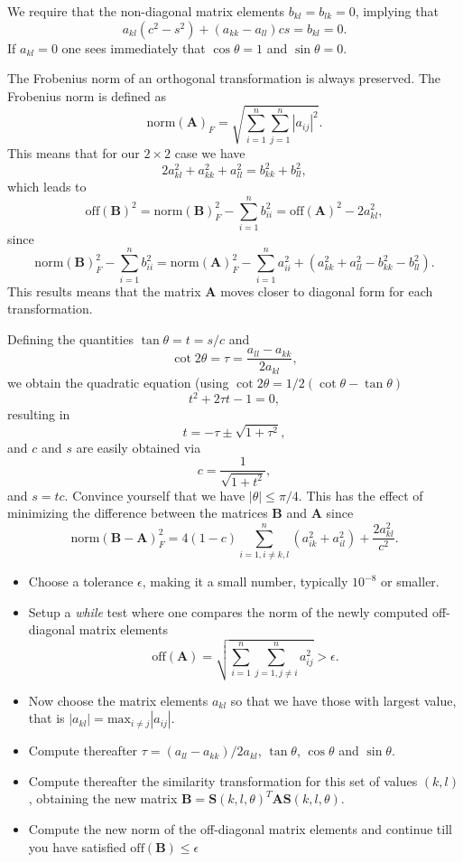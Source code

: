 \documentclass[%
oneside,                 %
final,                   %
10pt]{article}
\begin{document}
We require that the non-diagonal matrix elements $b_{kl}=b_{lk}=0$, implying that 
\[
a_{kl}(c^2-s^2)+(a_{kk}-a_{ll})cs = b_{kl} = 0.
\]
If $a_{kl}=0$ one sees immediately that $\cos\theta = 1$ and $\sin\theta=0$.

The Frobenius norm of an orthogonal transformation is always preserved. The Frobenius norm is defined
as 
\[
 \mathrm{norm}(\mathbf{A})_F =  \sqrt{\sum_{i=1}^n\sum_{j=1}^n |a_{ij}|^2}.
\]
This means that for our $2\times 2$ case  we have
\[
2a_{kl}^2+a_{kk}^2+a_{ll}^2 = b_{kk}^2+b_{ll}^2,
\]
which leads to
\[
\mathrm{off}(\mathbf{B})^2 = \mathrm{norm}(\mathbf{B})_F^2-\sum_{i=1}^nb_{ii}^2=\mathrm{off}(\mathbf{A})^2-2a_{kl}^2,
\]
since
\[
  \mathrm{norm}(\mathbf{B})_F^2-\sum_{i=1}^nb_{ii}^2=\mathrm{norm}(\mathbf{A})_F^2-\sum_{i=1}^na_{ii}^2+(a_{kk}^2+a_{ll}^2 -b_{kk}^2-b_{ll}^2).
\]
This results means that  the matrix $\mathbf{A}$ moves closer to diagonal form  for each transformation.

Defining the quantities $\tan\theta = t= s/c$ and
\[\cot 2\theta=\tau = \frac{a_{ll}-a_{kk}}{2a_{kl}},
\]
we obtain the quadratic equation (using $\cot 2\theta=1/2(\cot \theta-\tan\theta)$
\[
t^2+2\tau t-1= 0,
\]
resulting in 
\[
  t = -\tau \pm \sqrt{1+\tau^2},
\]
and $c$ and $s$ are easily obtained via
\[
   c = \frac{1}{\sqrt{1+t^2}},
\]
and $s=tc$.  Convince yourself that we have $|\theta| \le \pi/4$. This has the effect  
of minimizing the difference between the matrices $\mathbf{B}$ and $\mathbf{A}$ since
\[
\mathrm{norm}(\mathbf{B}-\mathbf{A})_F^2=4(1-c)\sum_{i=1,i\ne k,l}^n(a_{ik}^2+a_{il}^2) +\frac{2a_{kl}^2}{c^2}.
\]

\begin{itemize}
 \item Choose a tolerance $\epsilon$, making it a small number, typically $10^{-8}$ or smaller.

 \item Setup a \emph{while} test  where one compares the norm of the newly computed off-diagonal matrix elements  \[ \mathrm{off}(\mathbf{A}) = \sqrt{\sum_{i=1}^n\sum_{j=1,j\ne i}^n a_{ij}^2}   >  \epsilon. \]

 \item Now choose the matrix elements $a_{kl}$ so that we have those with largest value, that is $|a_{kl}|=\mathrm{max}_{i\ne j} |a_{ij}|$.

 \item Compute thereafter $\tau = (a_{ll}-a_{kk})/2a_{kl}$, $\tan\theta$, $\cos\theta$ and $\sin\theta$.

 \item Compute thereafter the similarity transformation for this set of values $(k,l)$, obtaining the new matrix $\mathbf{B}= \mathbf{S}(k,l,\theta)^T \mathbf{A}\mathbf{S}(k,l,\theta)$.

 \item Compute the new norm of the off-diagonal matrix elements and continue till you have satisfied $\mathrm{off}(\mathbf{B})  \le  \epsilon$
\end{itemize}
\end{document}
